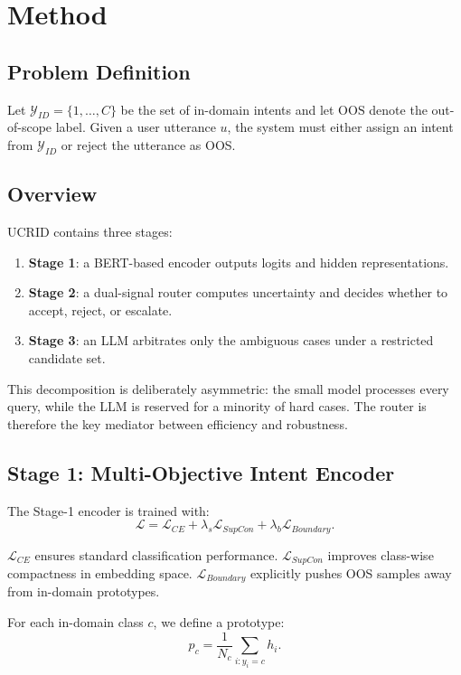 \documentclass[11pt]{article}
\begin{document}
\section{Method}
\subsection{Problem Definition}
Let $\mathcal{Y}_{ID}=\{1,\dots,C\}$ be the set of in-domain intents and let $\text{OOS}$ denote the out-of-scope label. Given a user utterance $u$, the system must either assign an intent from $\mathcal{Y}_{ID}$ or reject the utterance as OOS.

\subsection{Overview}
UCRID contains three stages:
\begin{enumerate}
\item \textbf{Stage 1}: a BERT-based encoder outputs logits and hidden representations.
\item \textbf{Stage 2}: a dual-signal router computes uncertainty and decides whether to accept, reject, or escalate.
\item \textbf{Stage 3}: an LLM arbitrates only the ambiguous cases under a restricted candidate set.
\end{enumerate}

This decomposition is deliberately asymmetric: the small model processes every query, while the LLM is reserved for a minority of hard cases. The router is therefore the key mediator between efficiency and robustness.

\subsection{Stage 1: Multi-Objective Intent Encoder}
The Stage-1 encoder is trained with:
\begin{equation}
\mathcal{L} = \mathcal{L}_{CE} + \lambda_s \mathcal{L}_{SupCon} + \lambda_b \mathcal{L}_{Boundary}.
\end{equation}

$\mathcal{L}_{CE}$ ensures standard classification performance. $\mathcal{L}_{SupCon}$ improves class-wise compactness in embedding space. $\mathcal{L}_{Boundary}$ explicitly pushes OOS samples away from in-domain prototypes.

For each in-domain class $c$, we define a prototype:
\begin{equation}
p_c = \frac{1}{N_c}\sum_{i:y_i=c} h_i.
\end{equation}
\end{document}
